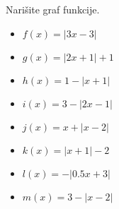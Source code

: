         \begin{naloga}
                Narišite graf funkcije. 
                \begin{multicols}{2}
                    \begin{itemize}
                        \item $f(x)=|3x-3|$ 
                        \item $g(x)=|2x+1|+1$ 
                        \item $h(x)=1-|x+1|$ 
                        \item $i(x)=3-|2x-1|$ 
                        \item $j(x)=x+|x-2|$ 
                        \item $k(x)=|x+1|-2$ 
                        \item $l(x)=-|0.5x+3|$ 
                        \item $m(x)=3-|x-2|$ 
                    \end{itemize}
                \end{multicols}
        \end{naloga}
